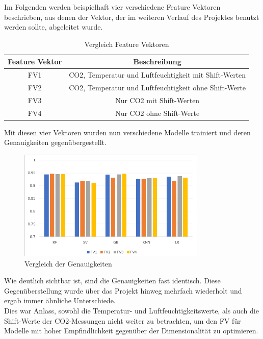 Im Folgenden werden beispielhaft vier verschiedene Feature Vektoren beschrieben, aus denen der Vektor, der im 
weiteren Verlauf des Projektes benutzt werden sollte, abgeleitet wurde.
\begin{center}
    \begin{table}[h]
        \centering
        \caption{Vergleich Feature Vektoren}
        \begin{tabular}{ |c||c| } 
        \hline
        Feature Vektor & Beschreibung \\ 
        \hline\hline
        FV1 & CO2, Temperatur und Luftfeuchtigkeit mit Shift-Werten\\ 
        FV2 & CO2, Temperatur und Luftfeuchtigkeit ohne Shift-Werte \\ 
        FV3 & Nur CO2 mit Shift-Werten\\ 
        FV4 & Nur CO2 ohne Shift-Werte \\
        \hline
        \end{tabular}
    \end{table}
\end{center}

Mit diesen vier Vektoren wurden nun verschiedene Modelle trainiert und deren Genauigkeiten gegenübergestellt.

\begin{figure}[h]
    \centering
    \includegraphics[width=0.8\textwidth]{pic/FV_comp.png}
    \caption{Vergleich der Genauigkeiten}
    \label{fig:FV_comp}
\end{figure}

Wie deutlich sichtbar ist, sind die Genauigkeiten fast identisch. Diese Gegenüberstellung wurde über das Projekt
hinweg mehrfach wiederholt und ergab immer ähnliche Unterschiede.\\
Dies war Anlass, sowohl die Temperatur- und Luftfeuchtigkeitswerte, als auch die Shift-Werte der CO2-Messungen 
nicht weiter zu betrachten, um den FV für Modelle mit hoher Empfindlichkeit gegenüber der Dimensionalität zu 
optimieren.

